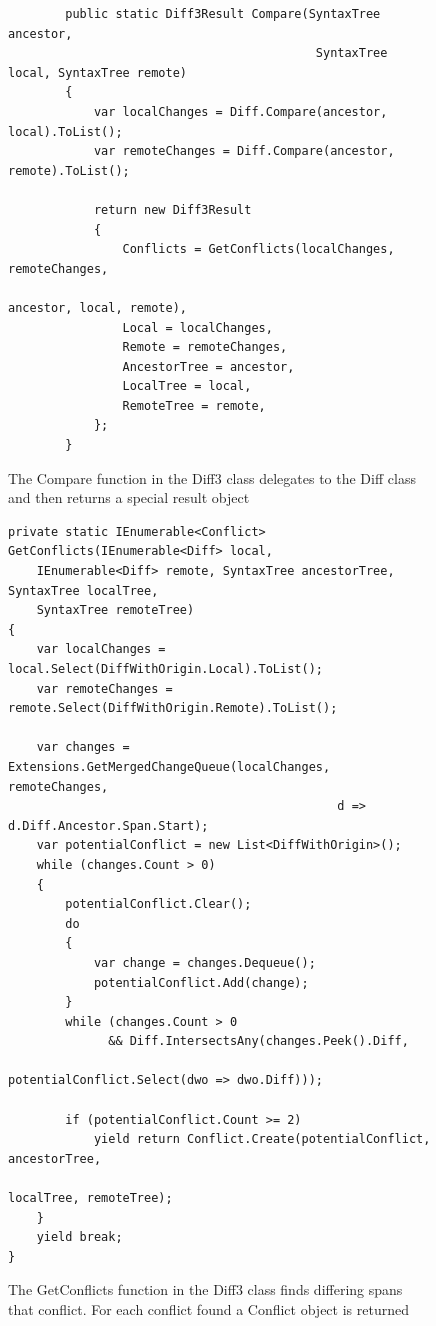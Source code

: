 \documentclass[draftclsnofoot,onecolumn]{IEEEtran}
\begin{document}
\begin{figure}[!t]
\centering
\begin{lstlisting}
        public static Diff3Result Compare(SyntaxTree ancestor, 
		                                   SyntaxTree local, SyntaxTree remote)
        {
            var localChanges = Diff.Compare(ancestor, local).ToList();
            var remoteChanges = Diff.Compare(ancestor, remote).ToList();

            return new Diff3Result
            {
                Conflicts = GetConflicts(localChanges, remoteChanges, 
				                                      ancestor, local, remote),
                Local = localChanges,
                Remote = remoteChanges,
                AncestorTree = ancestor,
                LocalTree = local,
                RemoteTree = remote,
            };
        }
\end{lstlisting}
\caption{The Compare function in the Diff3 class delegates to the Diff class 
and then returns a special result object}
\label{diff3compare}
\end{figure}

\begin{figure}[!t]
\centering
\begin{lstlisting}
private static IEnumerable<Conflict> GetConflicts(IEnumerable<Diff> local, 
    IEnumerable<Diff> remote, SyntaxTree ancestorTree, SyntaxTree localTree, 
	SyntaxTree remoteTree)
{
    var localChanges = local.Select(DiffWithOrigin.Local).ToList();
    var remoteChanges = remote.Select(DiffWithOrigin.Remote).ToList();

    var changes = Extensions.GetMergedChangeQueue(localChanges, remoteChanges, 
                                              d => d.Diff.Ancestor.Span.Start);
    var potentialConflict = new List<DiffWithOrigin>();
    while (changes.Count > 0)
    {
        potentialConflict.Clear();
        do
        {
            var change = changes.Dequeue();
            potentialConflict.Add(change);
        }
        while (changes.Count > 0 
              && Diff.IntersectsAny(changes.Peek().Diff, 
                                   potentialConflict.Select(dwo => dwo.Diff)));

        if (potentialConflict.Count >= 2)
            yield return Conflict.Create(potentialConflict, ancestorTree, 
			                                            localTree, remoteTree);
    }
    yield break;
}
\end{lstlisting}
\caption{The GetConflicts function in the Diff3 class finds differing spans 
that conflict. For each conflict found a Conflict object is returned}
\label{diff3getconflicts}
\end{figure}
\end{document}
